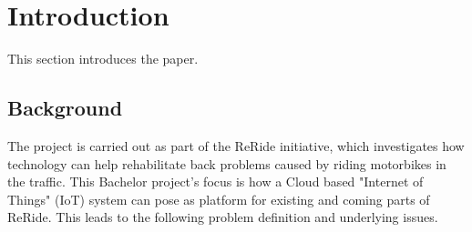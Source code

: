 \section{Introduction}
This section introduces the paper.

\subsection{Background}
The project is carried out as part of the ReRide initiative\cite{article:reride}, which investigates how technology can help rehabilitate back problems caused by riding motorbikes in the traffic. This Bachelor project's focus is how a Cloud based "Internet of Things" (IoT) system can pose as platform for existing and coming parts of ReRide. This leads to the following problem definition and underlying issues.